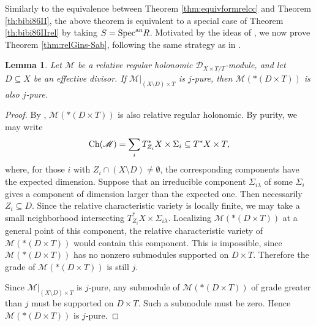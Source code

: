 \documentclass{amsart}
\theoremstyle{plain}
\numberwithin{theorem}{section}
\newtheorem{lemma}[theorem]{Lemma}
\theoremstyle{definition}
\theoremstyle{remark}
\theoremstyle{definition}
\newcommand{\sM}{\mathscr{M}}
\newcommand{\shD}{\mathscr{D}}
\newcommand{\Specan}{\textup{Spec}^{\textup{an}}}
\newcommand{\Ch}{\textup{Ch}}
\begin{document}
Similarly to the equivalence between Theorem \ref{thm:equivformrelcc} and Theorem \ref{th:bibi86II}, the above theorem is
equivalent to a special case of Theorem \ref{th:bibi86IIrel} by taking $S=\Specan R$. Motivated by the ideas of
\cite{BMM}, we now prove Theorem \ref{thm:relGins-Sab}, following the same
strategy as in \cite[\S 3.4]{Wuch}.

\begin{lemma}\label{lemApp:pureloc}
Let $\sM$ be a relative regular holonomic $\shD_{X\times T/T}$-module, and let
$D\subseteq X$ be an effective divisor. If
$\sM|_{(X\setminus D)\times T}$
is $j$-pure, then
$\sM(*(D\times T))$
is also $j$-pure.
\end{lemma}

\begin{proof}
By \cite[Cor.4.31]{FFS23},
$\sM(*(D\times T))$
is also relative regular holonomic. By purity, we may write
\[
\Ch(\sM)=\sum_i T^*_{Z_i}X\times \Sigma_i
\subseteq
T^*X\times T,
\]
where, for those $i$ with
$Z_i\cap (X\setminus D)\neq \emptyset$,
the corresponding components have the expected dimension. Suppose that an
irreducible component $\Sigma_{i\lambda}$ of some $\Sigma_i$ gives a component
of dimension larger than the expected one. Then necessarily
$Z_i\subseteq D.$
Since the relative characteristic variety is locally finite, we may take a
small neighborhood intersecting
$T^*_{Z_i}X\times \Sigma_{i\lambda}.$
Localizing $\sM(*(D\times T))$ at a general point of this component, the
relative characteristic variety of $\sM(*(D\times T))$ would contain this
component. This is impossible, since $\sM(*(D\times T))$ has no nonzero
submodules supported on $D\times T$. Therefore the grade of
$\sM(*(D\times T))$ is still $j$.

Since $\sM|_{(X\setminus D)\times T}$ is $j$-pure, any submodule of
$\sM(*(D\times T))$ of grade greater than $j$ must be supported on
$D\times T$. Such a submodule must be zero. Hence $\sM(*(D\times T))$ is
$j$-pure.
\end{proof}
\end{document}
